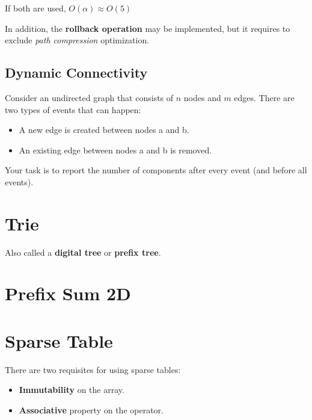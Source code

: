     If both are used, $O(\alpha) \approx O(5)$

    In addition, the \textbf{rollback operation} may be implemented, but it requires to exclude \textit{path compression} optimization.



    \subsection{Dynamic Connectivity}

    Consider an undirected graph that consists of $n$ nodes and $m$ edges. There are two types of events that can happen:

    \begin{itemize}
    \item A new edge is created between nodes a and b.
    \item An existing edge between nodes a and b is removed.
    \end{itemize}
    
    Your task is to report the number of components after every event (and before all events).



\section{Trie}

    Also called a \textbf{digital tree} or \textbf{prefix tree}.
    

\section{Prefix Sum 2D}


\section{Sparse Table}

    There are two requisites for using sparse tables:
    
    \begin{itemize}
        \item \textbf{Immutability} on the array.
        \item \textbf{Associative} property on the operator.
    \end{itemize}

